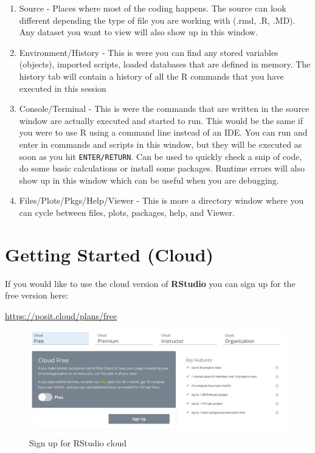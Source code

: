 \documentclass[
]{book}
\begin{document}
\begin{enumerate}
\def\labelenumi{\arabic{enumi}.}
\item
  Source - Places where most of the coding happens. The source can look different depending the type of file you are working with (.rmd, .R, .MD). Any dataset you want to view will also show up in this window.
\item
  Environment/History - This is were you can find any stored variables (objects), imported scripts, loaded databases that are defined in memory. The history tab will contain a history of all the R commands that you have executed in this session
\item
  Console/Terminal - This is were the commands that are written in the source window are actually executed and started to run. This would be the same if you were to use R using a command line instead of an IDE. You can run and enter in commands and scripts in this window, but they will be executed as soon as you hit \texttt{ENTER/RETURN}. Can be used to quickly check a snip of code, do some basic calculations or install some packages. Runtime errors will also show up in this window which can be useful when you are debugging.
\item
  Files/Plots/Pkgs/Help/Viewer - This is more a directory window where you can cycle between files, plots, packages, help, and Viewer.
\end{enumerate}

\hypertarget{getting-started-cloud}{%
\section{Getting Started (Cloud)}\label{getting-started-cloud}}

If you would like to use the cloud version of \textbf{RStudio} you can sign up for the free version here:

\url{https://posit.cloud/plans/free}

\begin{figure}
\includegraphics[width=17.6in]{images/2.2rcloud} \caption{Sign up for RStudio cloud}\label{fig:unnamed-chunk-8}
\end{figure}
\end{document}
